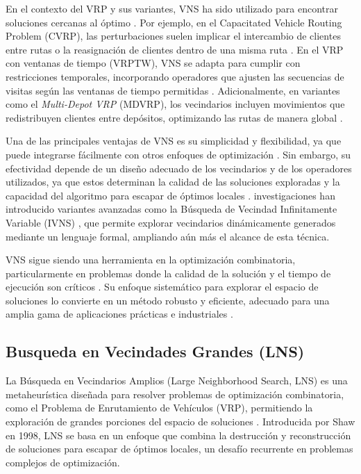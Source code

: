 \documentclass[12pt]{article}
\begin{document}
En el contexto del VRP y sus variantes, VNS ha sido  utilizado para encontrar soluciones cercanas al óptimo \agregaesto{[REF]}. Por ejemplo, en el Capacitated Vehicle Routing Problem (CVRP), las perturbaciones suelen implicar el intercambio de clientes entre rutas o la reasignación de clientes dentro de una misma ruta \agregaesto{[REF]}. En el VRP con ventanas de tiempo (VRPTW), VNS se adapta para cumplir con restricciones temporales, incorporando operadores que ajusten las secuencias de visitas según las ventanas de tiempo permitidas \agregaesto{[REF]}. Adicionalmente, en variantes como el \textit{Multi-Depot VRP} (MDVRP), los vecindarios incluyen movimientos que redistribuyen clientes entre depósitos, optimizando las rutas de manera global \agregaesto{[REF]}.

Una de las principales ventajas de VNS es su simplicidad y flexibilidad, ya que puede integrarse fácilmente con otros enfoques de optimización . Sin embargo, su efectividad depende de un diseño adecuado de los vecindarios y de los operadores utilizados, ya que estos determinan la calidad de las soluciones exploradas y la capacidad del algoritmo para escapar de óptimos locales \agregaesto{[REF]}.  investigaciones han introducido variantes avanzadas como la Búsqueda de Vecindad Infinitamente Variable (IVNS) \agregaesto{[REF]}, que permite explorar vecindarios dinámicamente generados mediante un lenguaje formal, ampliando aún más el alcance de esta técnica.

VNS sigue siendo una herramienta  en la optimización combinatoria, particularmente en problemas donde la calidad de la solución y el tiempo de ejecución son críticos . Su enfoque sistemático para explorar el espacio de soluciones lo convierte en un método robusto y eficiente, adecuado para una amplia gama de aplicaciones prácticas e industriales \agregaesto{[REF]}.


\subsection{Busqueda en Vecindades Grandes (LNS)}
La Búsqueda en Vecindarios Amplios (Large Neighborhood Search, LNS) es una metaheurística diseñada para resolver problemas de optimización combinatoria, como el Problema de Enrutamiento de Vehículos (VRP), permitiendo la exploración de grandes porciones del espacio de soluciones \agregaesto{[REF]}. Introducida por Shaw en 1998, LNS se basa en un enfoque  que combina la destrucción y reconstrucción de soluciones para escapar de óptimos locales, un desafío recurrente en problemas complejos de optimización.
\end{document}
